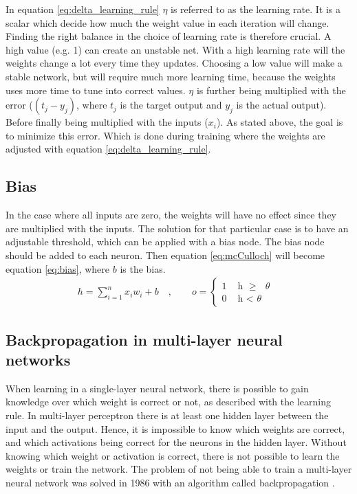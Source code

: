 \documentclass[USenglish]{ifimaster}  %
\begin{document}
In equation \cref{eq:delta_learning_rule} $\eta$ is referred to as the learning rate. It is a scalar which decide how much the weight value in each iteration will change. Finding the right balance in the choice of learning rate is therefore crucial. A high value (e.g. 1) can create an unstable net. With a high learning rate will the weights change a lot every time they updates. %
Choosing a low value will make a stable network, but will require much more learning time, because the weights uses more time to tune into correct values.
\newline
\newline
$\eta$ is further being multiplied with the error ($(t_j - y_j)$, where $t_j$ is the target output and $y_j$ is the actual output). Before finally being multiplied with the inputs ($x_i$). As stated above, the goal is to minimize this error. Which is done during training where the weights are adjusted with equation \cref{eq:delta_learning_rule}.
\subsection{Bias}
In the case where all inputs are zero, the weights will have no effect since they are multiplied with the inputs. The solution for that particular case is to have an adjustable threshold, which can be applied with a bias node. The bias node should be added to each neuron. Then equation \cref{eq:mcCulloch} will become equation \cref{eq:bias}, where $b$ is the bias.
\begin{equation}\label{eq:bias}
\begin{aligned}
    {h = \sum_{i=1}^{n} x_i w_i + b \quad , \quad\quad o = 
\begin{cases}
    1 & \text{ h $\geq$ $\theta$ }  \\
    0 & \text{ h < $\theta$ }
\end{cases}}
\end{aligned}
\end{equation}
\subsection{Backpropagation in multi-layer neural networks}
When learning in a single-layer neural network, there is possible to gain knowledge over which weight is correct or not, as described with the learning rule. In multi-layer perceptron there is at least one hidden layer between the input and the output. Hence, it is impossible to know which weights are correct, and which activations being correct for the neurons in the hidden layer. Without knowing which weight or activation is correct, there is not possible to learn the weights or train the network. The problem of not being able to train a multi-layer neural network was solved in 1986 with an algorithm called backpropagation \cite{Rumelhart:1986:LIR:104279.104293}.
\end{document}
